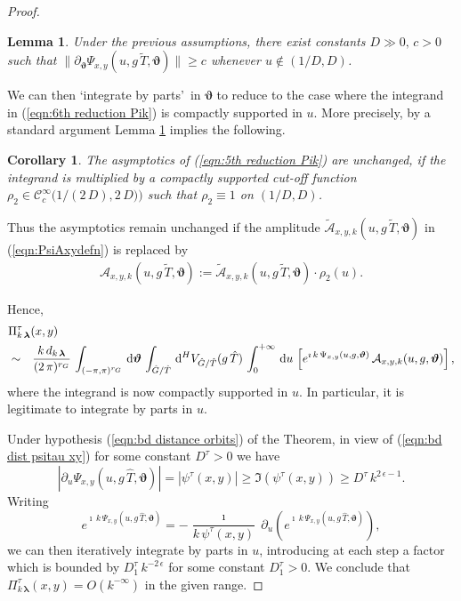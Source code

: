 \documentclass[12pt,a4paper]{article}
\theoremstyle{plain}
\newtheorem{cor}[thm]{Corollary}%
\newtheorem{lem}[thm]{Lemma}%
\theoremstyle{definition}
\begin{document}
\begin{proof}
\begin{lem}
\label{lem:partial theta bdd bl}
Under the previous assumptions, there exist constants $D\gg 0,\,c>0$
such that 
$\|\partial_{\boldsymbol{\vartheta}}\Psi_{x,y}(u,g\,\tilde{T},\boldsymbol{\vartheta})\|\ge c$ whenever $u\not\in (1/D,D)$.
\end{lem} 

We can then \lq integrate by parts\rq\, in $\boldsymbol{\vartheta}$ to reduce
to the case where the integrand in (\ref{eqn:6th reduction Pik})
is compactly supported in $u$. More precisely, by a standard argument
Lemma \ref{lem:partial theta bdd bl} implies the following.

\begin{cor}
\label{cor:compact supp u}
The asymptotics of (\ref{eqn:5th reduction Pik}) are unchanged, if the
integrand is multiplied by a compactly supported 
cut-off function 
$\rho_2\in \mathcal{C}^\infty_c\big( 1/(2\,D),2\,D) \big)$
such that $\rho_2\equiv 1$ on $(1/D,D)$.

\end{cor}
%
Thus the asymptotics remain unchanged if the
amplitude $\tilde{\mathcal{A}}_{x,y,k}(u,g\,\tilde{T},\boldsymbol{\vartheta})$ in (\ref{eqn:PsiAxydefn}) 
is replaced by
%
\begin{eqnarray}
\label{eqn:Axyredefn}
%
\mathcal{A}_{x,y,k}(u,g\,\tilde{T},\boldsymbol{\vartheta}):=
\tilde{\mathcal{A}}_{x,y,k}(u,g\,\tilde{T},\boldsymbol{\vartheta})
\cdot \rho_2(u).\nonumber
\end{eqnarray}

Hence,
\begin{eqnarray}
\label{eqn:7th reduction Pik}
\lefteqn{\Pi^\tau_{k\,\boldsymbol{\lambda}}(x,y)}\\
&\sim&\frac{ k\,d_{k\,\boldsymbol{\lambda}}}{(2\,\pi)^{r_G}}\,
\int_{(-\pi,\pi)^{r_G}}\,\mathrm{d}\boldsymbol{\vartheta}\,\int_{\hat{G}/\hat{T}}
\,\mathrm{d}^H V_{\hat{G}/\hat{T}}(g\,\hat{T})\,
\int_0^{+\infty}\,\mathrm{d}u\,
\left[e^{\imath\,k\,\Psi_{x,y}(u,g,\boldsymbol{\vartheta})}\,
\mathcal{A}_{x,y,k}(u,g,\boldsymbol{\vartheta})\right],\nonumber
\end{eqnarray} 
%
where the integrand is now compactly supported in $u$.
In particular, it is legitimate to integrate by parts in $u$.

Under hypothesis (\ref{eqn:bd distance orbits}) of the Theorem,
in view of (\ref{eqn:bd dist psitau xy}) for some 
constant $D^\tau>0$ we have
\begin{equation}
\label{eqn:der u Psixy}
\left|\partial_u \Psi_{x,y}(u,g\,\hat{T},\boldsymbol{\vartheta})\right|
=
\left|\psi^\tau (x,y)\right|\ge \Im\left(\psi^\tau(x,y)\right)
\ge D^\tau\,k^{2\,\epsilon-1}.
\end{equation}
Writing 
$$
e^{\imath\,k\,\Psi_{x,y}(u,g\,\hat{T},\boldsymbol{\vartheta})}
=-\frac{\imath}{k\,\psi^\tau (x,y)}\,\partial_u\left(
e^{\imath\,k\,\Psi_{x,y}(u,g\,\hat{T},\boldsymbol{\vartheta})}\right),
$$
we can then iteratively integrate by parts in $u$, introducing
at each step a factor which is bounded by $
D_1^\tau \,k^{-2\,\epsilon}$ for some constant $D_1^\tau>0$.
We conclude that
$\Pi^\tau_{k\,\boldsymbol{\lambda}}(x,y)=O\left(k^{-\infty}\right)$
in the given range.
\end{proof}
\end{document}
